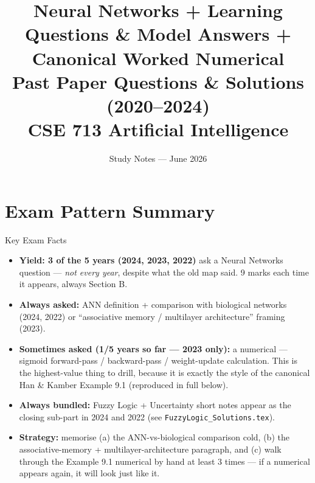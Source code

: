 \documentclass[12pt,a4paper]{article}
\title{\color{planblue}\Huge\bfseries Neural Networks + Learning\\[0.4em]
  \Large Questions \& Model Answers + Canonical Worked Numerical\\[0.2em]
  \normalsize Past Paper Questions \& Solutions (2020--2024)\\[0.2em]
  \normalsize CSE 713 Artificial Intelligence}
\author{Study Notes --- June 2026}
\date{}
\begin{document}
\maketitle
\tableofcontents
\newpage

\section*{Exam Pattern Summary}

\begin{keybox}{Key Exam Facts}
\begin{itemize}[noitemsep]
  \item \textbf{Yield: 3 of the 5 years (2024, 2023, 2022)} ask a Neural Networks question --- \emph{not every year}, despite what the old map said. 9 marks each time it appears, always Section B.
  \item \textbf{Always asked:} ANN definition + comparison with biological networks (2024, 2022) or ``associative memory / multilayer architecture'' framing (2023).
  \item \textbf{Sometimes asked (1/5 years so far --- 2023 only):} a numerical --- sigmoid forward-pass / backward-pass / weight-update calculation. This is the highest-value thing to drill, because it is exactly the style of the canonical Han \& Kamber Example 9.1 (reproduced in full below).
  \item \textbf{Always bundled:} Fuzzy Logic + Uncertainty short notes appear as the closing sub-part in 2024 and 2022 (see \texttt{FuzzyLogic\_Solutions.tex}).
  \item \textbf{Strategy:} memorise (a) the ANN-vs-biological comparison cold, (b) the associative-memory + multilayer-architecture paragraph, and (c) walk through the Example 9.1 numerical by hand at least 3 times --- if a numerical appears again, it will look just like it.
\end{itemize}
\end{keybox}
\end{document}
